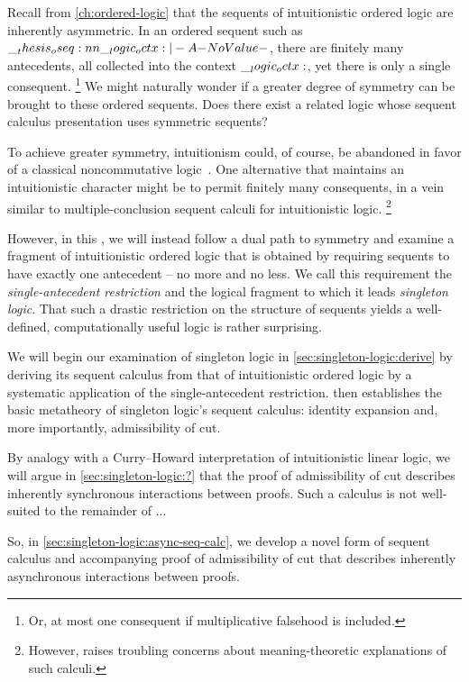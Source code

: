 Recall from \cref{ch:ordered-logic} that the sequents of intuitionistic ordered logic are inherently asymmetric.
In an ordered sequent such as $\oseq{\octx |- A}$, there are finitely many antecedents, all collected into the context $\__logic_octx:$, yet there is only a single consequent.%
\footnote{Or, at most one consequent if multiplicative falsehood is included.}
We might naturally wonder if a greater degree of symmetry can be brought to these ordered sequents.
Does there exist a related logic whose sequent calculus presentation uses symmetric sequents?

To achieve greater symmetry, intuitionism could, of course, be abandoned in favor of a classical noncommutative logic~\autocite{Abrusci:JSL91}.
One alternative that maintains an intuitionistic character might be to permit finitely many consequents, in a vein similar to multiple-conclusion sequent calculi for intuitionistic logic\autocite{??}.%
\footnote{However, \textcite{Steinberger:JPL11} raises troubling concerns about meaning-theoretic explanations of such calculi.}

However, in this , we will instead follow a dual path to symmetry and examine a fragment of intuitionistic ordered logic that is obtained by requiring sequents to have exactly one antecedent -- no more and no less.
We call this requirement the \emph{single-antecedent restriction} and the logical fragment to which it leads \emph{singleton logic}.
That such a drastic restriction on the structure of sequents yields a well-defined, computationally useful logic is rather surprising.

We will begin our examination of singleton logic in \cref{sec:singleton-logic:derive} by deriving its sequent calculus from that of intuitionistic ordered logic by a systematic application of the single-antecedent restriction.
 then establishes the basic metatheory of singleton logic's sequent calculus: identity expansion and, more importantly, admissibility of cut.

By analogy with a Curry--Howard interpretation of intuitionistic linear logic\autocite{Toninho:?}, we will argue in \cref{sec:singleton-logic:?} that the proof of admissibility of cut describes inherently synchronous interactions between proofs.
Such a calculus is not well-suited to the remainder of ...

So, in \cref{sec:singleton-logic:async-seq-calc}, we develop a novel form of sequent calculus and accompanying proof of admissibility of cut that describes inherently asynchronous interactions between proofs.

